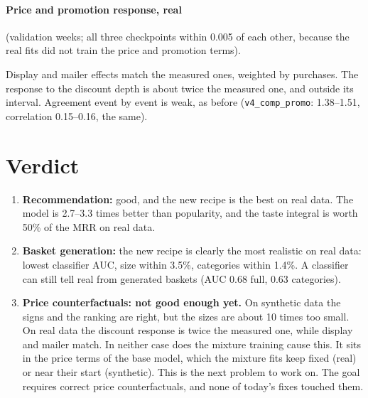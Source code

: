 \documentclass[11pt]{article}
\begin{document}
\paragraph{Price and promotion response, real} (validation weeks; all three checkpoints within
0.005 of each other, because the real fits did not train the price and promotion terms).
\begin{center}\small
{}
\end{center}
Display and mailer effects match the measured ones, weighted by purchases. The response to the
discount depth is about twice the measured one, and outside its interval. Agreement event by event
is weak, as before (\texttt{v4\_comp\_promo}: 1.38--1.51, correlation 0.15--0.16, the same).

\section{Verdict}

\begin{enumerate}
\item \textbf{Recommendation:} good, and the new recipe is the best on real data. The model is
  2.7--3.3 times better than popularity, and the taste integral is worth 50\% of the MRR on real
  data.
\item \textbf{Basket generation:} the new recipe is clearly the most realistic on real data:
  lowest classifier AUC, size within 3.5\%, categories within 1.4\%. A classifier can still tell
  real from generated baskets (AUC 0.68 full, 0.63 categories).
\item \textbf{Price counterfactuals: not good enough yet.} On synthetic data the signs and the
  ranking are right, but the sizes are about 10 times too small. On real data the discount
  response is twice the measured one, while display and mailer match. In neither case does the
  mixture training cause this. It sits in the price terms of the base model, which the
  mixture fits keep fixed (real) or near their start (synthetic). This is the next problem to
  work on. The goal requires correct price counterfactuals, and none of today's fixes touched
  them.
\end{enumerate}
\end{document}
